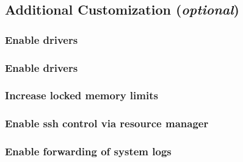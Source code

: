 \documentclass{ohpc-doc}
\begin{document}

\subsection{Additional Customization ({\em optional})} \label{sec:addl_customizations}


\subsubsection{Enable \InfiniBand{} drivers}


\subsubsection{Enable \OmniPath{} drivers}


\subsubsection{Increase locked memory limits}


\subsubsection{Enable ssh control via resource manager}


%

%
%
%

%

\subsubsection{Enable forwarding of system logs} \label{sec:add_syslog}

\end{document}
